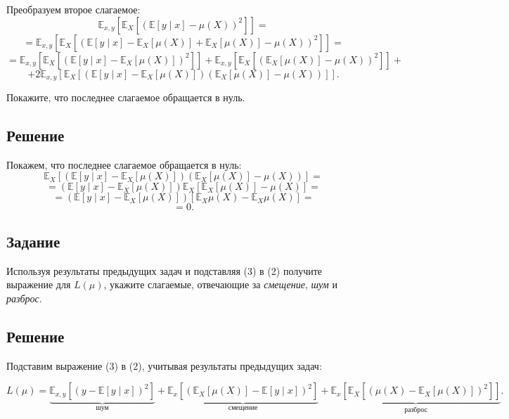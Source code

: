 Преобразуем второе слагаемое:
\[
\mathbb{E}_{x,y} \left[
\mathbb{E}_X \left[ \left( \mathbb{E}[y \mid x] - \mu(X) \right)^2 \right] \right] = \]
\[
= \mathbb{E}_{x,y} \left[
\mathbb{E}_X \left[ \left( \mathbb{E}[y \mid x] -
\mathbb{E}_X[\mu(X)] + \mathbb{E}_X[\mu(X)] - \mu(X) \right)^2 \right] \right] =
\]
\[
= \mathbb{E}_{x,y} \left[
\mathbb{E}_X \left[ \left( \mathbb{E}[y \mid x] - \mathbb{E}_X[\mu(X)] \right)^2 \right] \right]
+ \mathbb{E}_{x,y} \left[
\mathbb{E}_X \left[ \left( \mathbb{E}_X[\mu(X)] - \mu(X) \right)^2 \right] \right] +
\tag{3}\]
\[
+ 2 \mathbb{E}_{x,y} \left[
\mathbb{E}_X \left[ \left( \mathbb{E}[y \mid x] - \mathbb{E}_X[\mu(X)] \right)
\left( \mathbb{E}_X[\mu(X)] - \mu(X) \right) \right] \right].
\]

Покажите, что последнее слагаемое обращается в нуль.

\subsection*{Решение}

Покажем, что последнее слагаемое обращается в нуль:
\[
\mathbb{E}_X \left[ \left( \mathbb{E}[y \mid x] - \mathbb{E}_X \left[ \mu(X) \right] \right)
\left( \mathbb{E}_X \left[ \mu(X) \right] - \mu(X) \right) \right] =
\]
\[
= \left( \mathbb{E}[y \mid x] - \mathbb{E}_X \left[ \mu(X) \right] \right)
\mathbb{E}_X \left[ \mathbb{E}_X \left[ \mu(X) \right] - \mu(X) \right] =
\]
\[
= \left( \mathbb{E}[y \mid x] - \mathbb{E}_X \left[ \mu(X) \right] \right)
\left[ \mathbb{E}_X \mu(X) - \mathbb{E}_X \mu(X) \right] =
\]
\[
= 0.
\]

\subsection*{Задание}

Используя результаты предыдущих задач и подставляя (3) в (2) получите выражение для $L(\mu)$, укажите слагаемые, отвечающие за \emph{смещение}, \emph{шум} и \emph{разброс}.

\newpage

\subsection*{Решение}

Подставим выражение (3) в (2), учитывая результаты предыдущих задач:

\[
L(\mu) = \underbrace{\mathbb{E}_{x, y} \left[ \left( y - \mathbb{E}[y \mid x] \right)^2 \right]}_{\text{шум}}
+ \underbrace{\mathbb{E}_x \left[ \left( \mathbb{E}_X [\mu(X)] - \mathbb{E}[y \mid x] \right)^2 \right]}_{\text{смещение}}
+ \underbrace{\mathbb{E}_x \left[ \mathbb{E}_X \left[ \left( \mu(X) - \mathbb{E}_X[\mu(X)] \right)^2 \right] \right]}_{\text{разброс}}.
\]

